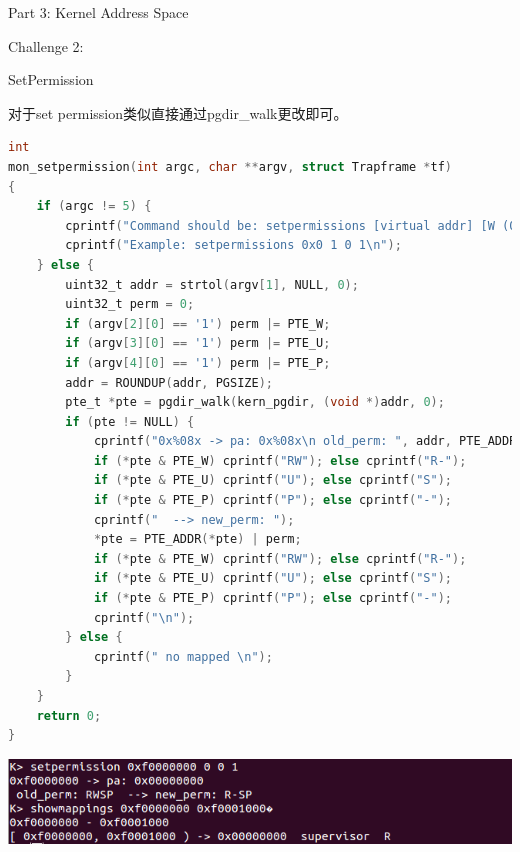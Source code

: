 \documentclass[GBK,winfonts,a4paper,10pt]{ctexart}
\begin{document}
\begin{section}{Part 3: Kernel Address Space}
\begin{subsection}{Challenge 2:}
\begin{subsubsection}{ SetPermission }
\par
对于set permission类似直接通过pgdir\_walk更改即可。
\begin{lstlisting}[language=C]
int
mon_setpermission(int argc, char **argv, struct Trapframe *tf)
{
    if (argc != 5) { 
        cprintf("Command should be: setpermissions [virtual addr] [W (0/1)] [U (0/1)] [P (0/1)]\n");
        cprintf("Example: setpermissions 0x0 1 0 1\n");
    } else {
        uint32_t addr = strtol(argv[1], NULL, 0);
        uint32_t perm = 0;
        if (argv[2][0] == '1') perm |= PTE_W;
        if (argv[3][0] == '1') perm |= PTE_U;
        if (argv[4][0] == '1') perm |= PTE_P;
        addr = ROUNDUP(addr, PGSIZE);
        pte_t *pte = pgdir_walk(kern_pgdir, (void *)addr, 0);
        if (pte != NULL) {
            cprintf("0x%08x -> pa: 0x%08x\n old_perm: ", addr, PTE_ADDR(*pte));
            if (*pte & PTE_W) cprintf("RW"); else cprintf("R-");
            if (*pte & PTE_U) cprintf("U"); else cprintf("S");
            if (*pte & PTE_P) cprintf("P"); else cprintf("-");
            cprintf("  --> new_perm: ");
            *pte = PTE_ADDR(*pte) | perm;     
            if (*pte & PTE_W) cprintf("RW"); else cprintf("R-");
            if (*pte & PTE_U) cprintf("U"); else cprintf("S");
            if (*pte & PTE_P) cprintf("P"); else cprintf("-");
            cprintf("\n");
        } else {
            cprintf(" no mapped \n");
        }
    }
    return 0;
}
\end{lstlisting}
\includegraphics[scale=0.5]{setpermission.png}
\end{subsubsection}


\end{subsection}
\end{section}
\end{document}
